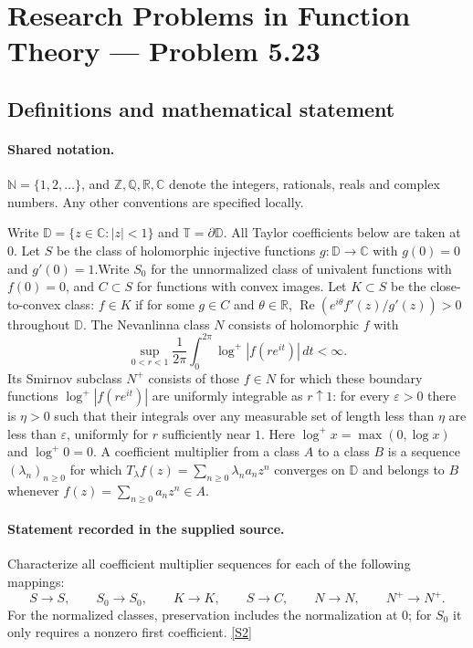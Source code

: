 \documentclass[11pt]{article}
\newcommand{\sref}[2]{\hyperlink{source:#1:#2}{[S#2]}}
\begin{document}
\section{Research Problems in Function Theory — Problem 5.23}\label{statement}

\subsection{Definitions and mathematical statement}

\paragraph{Shared notation.}$\mathbb N=\{1,2,\ldots\}$, and $\mathbb Z,\mathbb Q,\mathbb R,\mathbb C$ denote the integers, rationals, reals and complex numbers. Any other conventions are specified locally.


Write $\mathbb D=\{z\in\mathbb C:|z|<1\}$ and $\mathbb T=\partial\mathbb D$. All Taylor coefficients below are taken at $0$. Let $S$ be the class of holomorphic injective functions $g:\mathbb D\to\mathbb C$ with $g(0)=0$ and $g'(0)=1$.Write $S_0$ for the unnormalized class of univalent functions with $f(0)=0$, and $C\subset S$ for functions with convex images. Let $K\subset S$ be the close-to-convex class: $f\in K$ if for some $g\in C$ and $\theta\in\mathbb R$, $\operatorname{Re}(e^{i\theta}f'(z)/g'(z))>0$ throughout $\mathbb D$. The Nevanlinna class $N$ consists of holomorphic $f$ with
\[\sup_{0<r<1}\frac1{2\pi}\int_0^{2\pi}\log^+|f(re^{it})|\,dt<\infty.
\]
Its Smirnov subclass $N^+$ consists of those $f\in N$ for which these boundary functions $\log^+|f(re^{it})|$ are uniformly integrable as $r\uparrow1$: for every $\varepsilon>0$ there is $\eta>0$ such that their integrals over any measurable set of length less than $\eta$ are less than $\varepsilon$, uniformly for $r$ sufficiently near $1$. Here $\log^+x=\max(0,\log x)$ and $\log^+0=0$. A coefficient multiplier from a class $A$ to a class $B$ is a sequence $(\lambda_n)_{n\ge0}$ for which $T_\lambda f(z)=\sum_{n\ge0}\lambda_n a_nz^n$ converges on $\mathbb D$ and belongs to $B$ whenever $f(z)=\sum_{n\ge0}a_nz^n\in A$.
\paragraph{Statement recorded in the supplied source.}
Characterize all coefficient multiplier sequences for each of the following mappings:
\[S\to S,\qquad S_0\to S_0,\qquad K\to K,\qquad S\to C,\qquad N\to N,\qquad N^+\to N^+.
\]
For the normalized classes, preservation includes the normalization at $0$; for $S_0$ it only requires a nonzero first coefficient. \sref{statement}{2}
\end{document}
